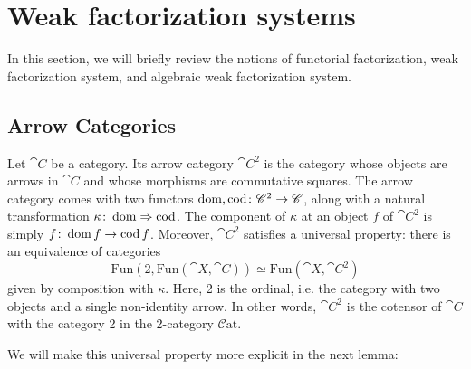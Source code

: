
\chapter{Weak factorization systems}

In this section, we will briefly review the notions of functorial factorization, weak factorization system, and algebraic weak factorization system. 

\section{Arrow Categories}

Let $\cat{C}$ be a category. Its arrow category $\cat{C}^2$ is the category whose objects are arrows in $\cat{C}$ and whose morphisms are commutative squares. The arrow category comes with two functors $\operatorname{dom},\operatorname{cod}\colon \mathscr{C}^2\to\mathscr{C}$, along with a natural transformation $\kappa\colon\operatorname{dom}\Rightarrow\operatorname{cod}$. The component of $\kappa$ at an object $f$ of $\cat{C}^2$ is simply $f\colon\operatorname{dom} f\to\operatorname{cod} f$. Moreover, $\cat{C}^2$ satisfies a universal property: there is an equivalence of categories
\begin{equation}\label{Eq:ArrowObject}
	\mathrm{Fun}(2,\mathrm{Fun}(\cat{X},\cat{C}))\simeq\mathrm{Fun}(\cat{X},\cat{C}^2)
\end{equation}
given by composition with $\kappa$. Here, 2 is the ordinal, i.e. the category with two objects and a single non-identity arrow. In other words, $\cat{C}^2$ is the cotensor of $\cat{C}$ with the category 2 in the 2-category $\mathcal{C}\mathrm{at}$.

We will make this universal property more explicit in the next lemma:

